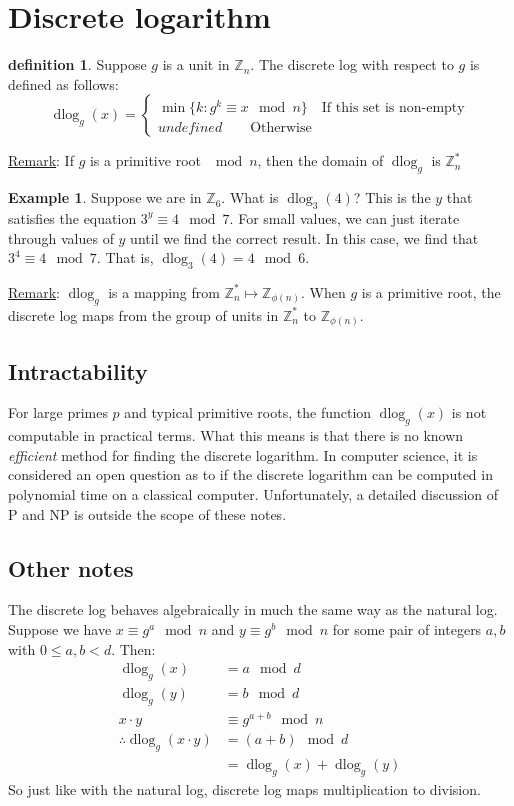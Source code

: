 \documentclass[10pt]{article}
\newcommand{\Z}{\mathbb{Z}}
\theoremstyle{definition}
\newtheorem{definition}[theorem]{definition}
\newtheorem{ex}[theorem]{Example}
\theoremstyle{remark}
\def\Z{\mathbb{ Z}}
\DeclareMathOperator{\dlog}{dlog}
\begin{document}
\section{Discrete logarithm}
\begin{definition}
Suppose $g$ is a unit in $\Z_n$.  The discrete log with respect to $g$ is defined as follows:
$$\dlog_g(x)=
\begin{cases}
\min \{k:g^k\equiv x \mod n\} \quad \text{If this set is non-empty}\\
undefined \qquad  \text{Otherwise}
\end{cases}$$
\end{definition}
\underline{Remark}: If $g$ is a primitive root $\mod n$, then the domain of $\dlog_g$ is $\Z_{n}^*$
\begin{ex}
Suppose we are in $\Z_6$.  What is $\dlog_3(4)$?  This is the $y$ that satisfies the equation $3^y \equiv 4 \mod 7$.  For small values, we can just iterate through values of $y$ until we find the correct result.  In this case, we find that $3^4 \equiv 4 \mod 7$.  That is, $\dlog_3(4) = 4 \mod 6$.
\end{ex}
\underline{Remark}: $\dlog_g$ is a mapping from $\Z_{n}^* \mapsto \Z_{\phi(n)}$.
When $g$ is a primitive root, the discrete log maps from the group of units in $\Z_{n}^*$ to $\Z_{\phi(n)}$.
\subsection{Intractability}
For large primes $p$ and typical primitive roots, the function $\dlog_g(x)$ is not computable in practical terms.  What this means is that there is no known \textit{efficient} method for finding the discrete logarithm.  In computer science, it is considered an open question as to if the discrete logarithm can be computed in polynomial time on a classical computer.  Unfortunately, a detailed discussion of P and NP is outside the scope of these notes.
\subsection{Other notes}
The discrete log behaves algebraically in much the same way as the natural log.
Suppose we have $x \equiv g^a \mod n$ and $y \equiv g^b \mod n$ for some pair of integers $a,b$ with $0\leq a,b < d$.  Then:
\begin{align*}
\dlog_g(x) &= a \mod d \\
\dlog_g(y) &= b \mod d \\
x \cdot y &\equiv g^{a+b} \mod n \\
\therefore \dlog_g(x \cdot y) &= (a + b) \mod d \\
&= \dlog_g(x) + \dlog_g(y)
\end{align*}
So just like with the natural log, discrete log maps multiplication to division.
\end{document}

